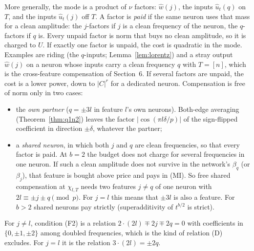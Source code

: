 \documentclass[11pt]{article}
\theoremstyle{definition}
\begin{document}
More generally, the mode is a product of $\nu$ factors: $\hat w(j)$, the inputs $\hat u_t(q)$ on $T$, and the inputs $\hat u_t(j)$ off $T$.  A factor
is \emph{paid} if the same neuron uses that mass for a clean amplitude: the $j$-factors if $j$ is a clean frequency of the neuron, the
$q$-factors if $q$ is.  Every unpaid factor is norm that buys no clean amplitude, so it is charged to $U$.  If exactly one factor is unpaid,
the cost is quadratic in the mode.  Examples are riding (the $q$-inputs; Lemma~\ref{lem:lorentz}) and a stray output $\hat w(j)$ on a neuron whose inputs
carry a clean frequency $q$ with $T=[n]$, which is the cross-feature compensation of Section~6.  If several factors are unpaid, the cost is a
lower power, down to $|C|^{r}$ for a dedicated neuron.  Compensation is free of norm only in two cases:
\begin{itemize}
\item[(F1)] the \emph{own partner} ($q=\pm3l$ in feature $l$'s own neurons).  Both-edge averaging (Theorem~\ref{thm:q1n2}) leaves the factor
$|\cos(\pi l\delta/p)|$ of the sign-flipped coefficient in direction $\pm\delta$, whatever the partner;
\item[(F2)] a \emph{shared neuron}, in which both $j$ and $q$ are clean frequencies, so that every factor is paid.  At $b=2$ the budget does not
charge for several frequencies in one neuron.  If such a clean amplitude does not survive in the network's $\beta_q$ (or $\beta_j$), that
feature is bought above price and pays in (MI).  So free shared compensation at $\chi_{l,T}$ needs two features $j\ne q$ of one neuron with
$2l\equiv\pm j\pm q\pmod p$.  For $j=l$ this means that $\pm3l$ is also a feature.  For $b>2$ shared neurons pay strictly (superadditivity of
$t^{b/2}$ is strict).
\end{itemize}
For $j\ne l$, condition (F2) is a relation $2\cdot(2l)\mp2j\mp2q=0$ with coefficients in $\{0,\pm1,\pm2\}$ among doubled frequencies, which
is the kind of relation (D) excludes.  For $j=l$ it is the relation $3\cdot(2l)=\pm2q$.
\end{document}
